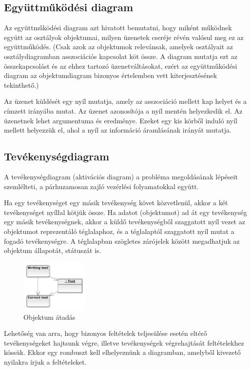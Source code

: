 \documentclass[margin=0px]{article}
\begin{document}
\subsection{Együttműködési diagram}
Az együttműködési diagram azt hivatott bemutatni, hogy miként működnek együtt az osztályok objektumai, milyen üzenetek cseréje révén valósul meg ez az együttműködés.
(Csak azok az objektumok relevánsak, amelyek osztályait az osztálydiagramban asszociációs kapcsolat köt össze. A diagram mutatja ezt az összekapcsolást és az ehhez tartozó
üzenetváltásokat, ezért az együttműködési diagram az objektumdiagram bizonyos értelemben vett kiterjesztésének tekinthető.)

Az üzenet küldését egy nyíl mutatja, amely az asszociáció mellett kap helyet és a címzett irányába mutat. Az üzenet azonosítója a nyíl mentén helyezkedik el. Az üzenetnek lehet argumentuma és eredménye. Ezeket egy kis körből induló nyíl mellett helyezzük el, ahol a nyíl az információ áramlásának irányát mutatja.


\subsection{Tevékenységdiagram}
A tevékenységdiagram (aktivációs diagram) a probléma megoldásának lépéseit szemlélteti, a párhuzamosan zajló vezérlési folyamatokkal együtt.

Ha egy tevékenységet
egy másik tevékenység követ közvetlenül, akkor a két tevékenységet
nyíllal kötjük össze. Ha adatot (objektumot) ad át egy tevékenység
egy másik tevékenységnek, akkor a küldő tevékenységből szaggatott
nyíl vezet az objektumot reprezentáló téglalaphoz, és a téglalaptól
szaggatott nyíl mutat a fogadó tevékenységre. A téglalapban szögletes
zárójelek között megadhatjuk az objektum állapotát, státuszát is.
\begin{figure}[H]
    \centering
    \includegraphics[width=0.3\textwidth]{img/tevekenyseg.png}
    \caption{Objektum átadás}
\end{figure}

Lehetőség van arra, hogy bizonyos feltételek teljesülése esetén eltérő
tevékenységeket hajtsunk végre, illetve tevékenységek végrehajtását
feltételekhez kössük. Ekkor egy rombuszt kell elhelyeznünk a diagramban,
amelyből kivezető nyilakra írjuk a feltételeket.
\end{document}
